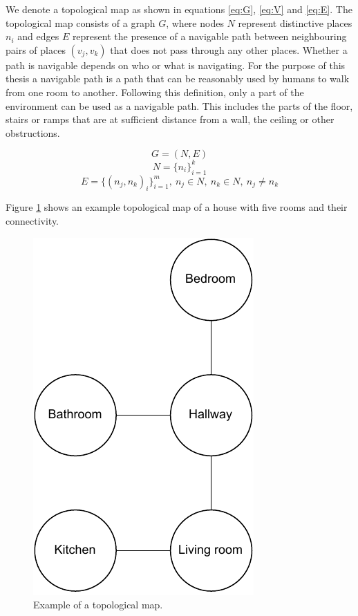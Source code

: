 We denote a topological map as shown in equations \ref{eq:G}, \ref{eq:V} and \ref{eq:E}. The topological map consists of a graph \(G\), where nodes \(N\) represent distinctive places \(n_i\) and edges \(E\) represent the presence of a navigable path between neighbouring pairs of places \((v_j,v_k)\) that does not pass through any other places. Whether a path is navigable depends on who or what is navigating. For the purpose of this thesis a navigable path is a path that can be reasonably used by humans to walk from one room to another. Following this definition, only a part of the environment can be used as a navigable path. This includes the parts of the floor, stairs or ramps that are at sufficient distance from a wall, the ceiling or other obstructions.


\begin{equation}
    \label{eq:G}
    G=(N, E)
\end{equation}
\begin{equation}
    \label{eq:V}
    N=\{n_i\}_{i=1}^k
\end{equation}
\begin{equation}
    \label{eq:E}
    E=\{(n_j,n_k)_i\}_{i=1}^m,\ n_j \in N,\ n_k \in N,\ n_j \neq n_k
\end{equation}

Figure \ref{fig:topomap} shows an example topological map of a house with five rooms and their connectivity.

\begin{figure}[h]
    \centering
    \includegraphics*[width=.3\textwidth]{./fig/topological_map.pdf}
    \caption{Example of a topological map.}
    \label{fig:topomap}
\end{figure}

\pagebreak

